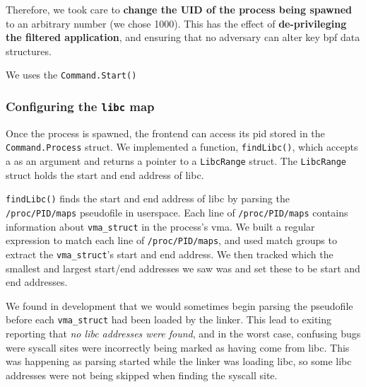 Therefore, we took care to \textbf{change the UID of the process being spawned}
to an arbitrary number (we chose 1000). This has the effect of
\textbf{de-privileging the filtered application}, and ensuring that no adversary
can alter key \ac{bpf} data structures.



We uses the \texttt{Command.Start()}

\subsubsection{Configuring the \texttt{libc} map}
Once the process is spawned, the frontend can access its \ac{pid} stored in the
\texttt{Command.Process} struct. We implemented a function, 
\texttt{findLibc()}, which accepts a  as an argument and returns a pointer to 
a \texttt{LibcRange}  struct. The \texttt{LibcRange} struct holds the start and end 
address of \ac{libc}.

\texttt{findLibc()} finds the start and end address of \ac{libc} by parsing the
\texttt{/proc/PID/maps} pseudofile in userspace. Each line of \texttt{/proc/PID/maps}
contains information about \texttt{vma\_struct} in the process's \ac{vma}. We
built a regular expression to match each line of \texttt{/proc/PID/maps}, and
used match groups to extract the \texttt{vma\_struct}'s start and end address.
We then tracked which the smallest and largest start/end addresses we saw was
and set these to be  start and end addresses.

We found in development that we would sometimes begin parsing the pseudofile
before each \texttt{vma\_struct} had been loaded by the linker. This lead to
\af exiting reporting that \textit{no \ac{libc} addresses were found}, and in
the worst case, confusing bugs were syscall sites were incorrectly being marked as 
having come from \ac{libc}. This was happening as parsing started while the
linker was loading \ac{libc}, so some \ac{libc} addresses were not being skipped
when finding the syscall site.

